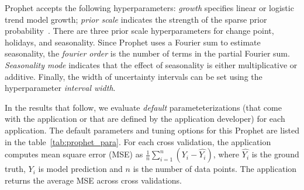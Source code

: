 
Prophet accepts the following hyperparameters: 
\textit{growth} specifies linear or
logistic trend model growth; \textit{prior scale} indicates the strength of
the sparse prior probability~\cite{ref:sparse_prior}.  There are three prior
scale hyperparameters for change point, holidays, and seasonality.  Since
Prophet uses a Fourier sum to estimate seasonality, the \textit{fourier order}
is the number of terms in the partial Fourier sum. \textit{Seasonality mode}
indicates that the effect of seasonality is either multiplicative or additive.
Finally, the width of uncertainty intervals can be set using the
hyperparameter \textit{interval width}.

In the results that follow, we evaluate \textit{default} parameteterizations
(that come with the application or that are defined by the application
developer) for each application.  The default parameters and tuning options
for this Prophet are listed in the table~\ref{tab:prophet_para}. For each
cross validation, the application computes mean square error (MSE) as
$\frac{1}{n}\sum_{i=1}^{n}(Y_i - \hat{Y_i})$, where $\hat{Y_i}$ is the ground
truth, $Y_i$ is model prediction and $n$ is the number of data points. The
application returns the average MSE across cross validations. 

\begin{table}[t]
\centering
\scriptsize
{}
\caption{Default hyperparameters for Prophet. The default value and tuning options are listed. 
\label{tab:prophet_para}}
\vspace{-0.2in}
\end{table}

